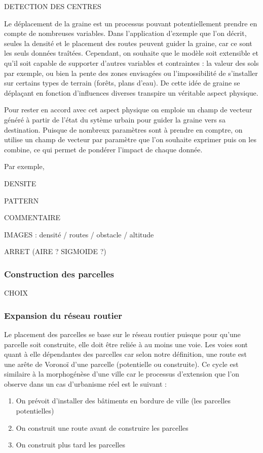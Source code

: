 \documentclass[12pt]{article}
\begin{document}
DETECTION DES CENTRES

Le déplacement de la graine est un processus pouvant potentiellement
prendre en compte de nombreuses variables. Dans l'application
d'exemple que l'on décrit, seules la densité et le placement des
routes peuvent guider la graine, car ce sont les seuls données
traîtées. Cependant, on souhaite que le modèle soit extensible et
qu'il soit capable de supporter d'autres variables et contraintes : la
valeur des sols par exemple, ou bien la pente des zones envisagées ou
l'impossibilité de s'installer sur certains types de terrain (forêts,
plans d'eau). De cette idée de graine se déplaçant en fonction
d'influences diverses transpire un véritable aspect physique.

Pour rester en accord avec cet aspect physique on emploie un champ de
vecteur généré à partir de l'état du sytème urbain pour guider la
graine vers sa destination. Puisque de nombreux paramètres sont à
prendre en comptre, on utilise un champ de vecteur par paramètre que
l'on souhaite exprimer puis on les combine, ce qui permet de pondérer
l'impact de chaque donnée.

Par exemple,

DENSITE

PATTERN

COMMENTAIRE

IMAGES : densité / routes / obstacle / altitude

ARRET (AIRE ? SIGMOIDE ?)

\subsubsection{Construction des parcelles}

CHOIX

\subsubsection{Expansion du réseau routier}

Le placement des parcelles se base sur le réseau routier puisque pour
qu'une parcelle soit construite, elle doit être reliée à au moins une
voie. Les voies sont quant à elle dépendantes des parcelles car selon
notre définition, une route est une arête de Voronoï d'une parcelle
(potentielle ou construite). Ce cycle est similaire à la morphogénèse
d'une ville car le processus d'extension que l'on observe dans un cas
d'urbanisme réel est le suivant :

\begin{enumerate}
\item{On prévoit d'installer des bâtiments en bordure de ville (les
  parcelles potentielles)}
\item{On construit une route avant de construire les parcelles}
\item{On construit plus tard les parcelles}
\end{enumerate}
\end{document}
